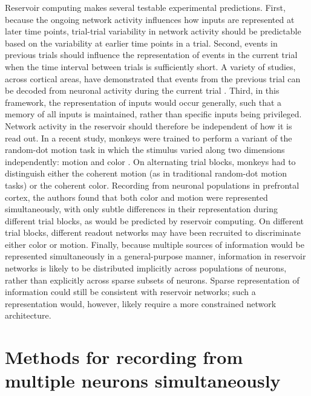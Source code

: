 \bigskip
Reservoir computing makes several testable experimental predictions. First, because the ongoing network activity influences how inputs are represented at later time points, trial-trial variability in network activity should be predictable based on the variability at earlier time points in a trial. Second, events in previous trials should influence the representation of events in the current trial when the time interval between trials is sufficiently short. A variety of studies, across cortical areas, have demonstrated that events from the previous trial can be decoded from neuronal activity during the current trial \citep{Bernacchia:2011bb, Donahue:2015fi, Seo:2007jp, Seo:2007jv, Nikolic:2009cf, Klampfl:2012cm, Seo:2009jl, Sugrue:2004ex, Chaudhuri:2015jb, Murray:2014ee}. Third, in this framework, the representation of inputs would occur generally, such that a memory of all inputs is maintained, rather than specific inputs being privileged. Network activity in the reservoir should therefore be independent of how it is read out. In a recent study, monkeys were trained to perform a variant of the random-dot motion task in which the stimulus varied along two dimensions independently: motion and color \citep{Mante:2013ie}. On alternating trial blocks, monkeys had to distinguish either the coherent motion (as in traditional random-dot motion tasks) or the coherent color. Recording from neuronal populations in prefrontal cortex, the authors found that both color and motion were represented simultaneously, with only subtle differences in their representation during different trial blocks, as would be predicted by reservoir computing. On different trial blocks, different readout networks may have been recruited to discriminate either color or motion. Finally, because multiple sources of information would be represented simultaneously in a general-purpose manner, information in reservoir networks is likely to be distributed implicitly across populations of neurons, rather than explicitly across sparse subsets of neurons. Sparse representation of information could still be consistent with reservoir networks; such a representation would, however, likely require a more constrained network architecture.

\section{Methods for recording from multiple neurons simultaneously} \label{intro:multiple_neurons}

